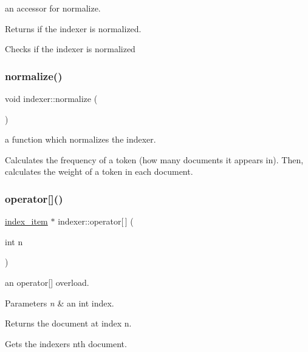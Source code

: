 an accessor for normalize. 

\begin{DoxyReturn}{Returns}
if the indexer is normalized.
\end{DoxyReturn}
Checks if the indexer is normalized \mbox{\label{classindexer_afd19e249c5224de7b4b308c5420f2412}} 
\subsubsection{\texorpdfstring{normalize()}{normalize()}}
{\footnotesize\ttfamily void indexer\+::normalize (\begin{DoxyParamCaption}{ }\end{DoxyParamCaption})}



a function which normalizes the indexer. 

Calculates the frequency of a token (how many documents it appears in). Then, calculates the weight of a token in each document. \mbox{\label{classindexer_ae71041fc84d94155473de60e4407d5cc}} 
\subsubsection{\texorpdfstring{operator[]()}{operator[]()}}
{\footnotesize\ttfamily \hyperlink{classindex__item}{index\+\_\+item} $\ast$ indexer\+::operator\mbox{[}$\,$\mbox{]} (\begin{DoxyParamCaption}\item[{int}]{n }\end{DoxyParamCaption})\hspace{0.3cm}{\ttfamily [virtual]}}



an operator\mbox{[}\mbox{]} overload. 


\begin{DoxyParams}{Parameters}
{\em n} & an int index. \\
\hline
\end{DoxyParams}
\begin{DoxyReturn}{Returns}
the document at index n.
\end{DoxyReturn}
Gets the indexer\textquotesingle{}s n\textquotesingle{}th document. 

